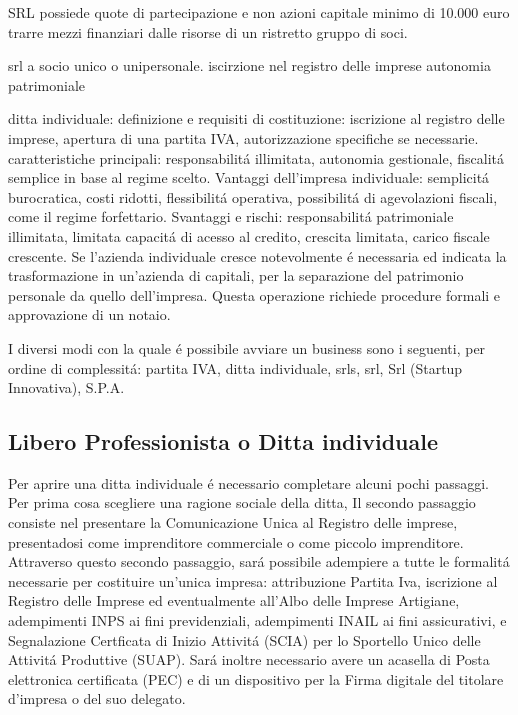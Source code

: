 \documentclass{article}
\begin{document}
SRL
possiede quote di partecipazione e non azioni
capitale minimo di 10.000 euro
trarre mezzi finanziari dalle risorse di un ristretto gruppo di soci. 

srl a socio unico o unipersonale.
iscirzione nel registro delle imprese
autonomia patrimoniale

ditta individuale:
definizione e requisiti di costituzione: iscrizione al registro delle imprese, apertura di una partita IVA, autorizzazione specifiche se necessarie.
caratteristiche principali: responsabilit\'a illimitata, autonomia gestionale, fiscalit\'a semplice in base al regime scelto.
Vantaggi dell'impresa individuale: semplicit\'a burocratica, costi ridotti, flessibilit\'a operativa, possibilit\'a di agevolazioni fiscali, come il regime forfettario.
Svantaggi e rischi: responsabilit\'a patrimoniale illimitata, limitata capacit\'a di acesso al credito, crescita limitata, carico fiscale crescente. 
Se l'azienda individuale cresce notevolmente \'e necessaria ed indicata la trasformazione in un'azienda di capitali, per la separazione del patrimonio personale da quello dell'impresa. Questa operazione richiede procedure formali e approvazione di un notaio.

I diversi modi con la quale \'e possibile avviare un business sono i seguenti, per ordine di complessit\'a:
partita IVA, ditta individuale, srls, srl, Srl (Startup Innovativa), S.P.A.


\subsection{Libero Professionista o Ditta individuale}
Per aprire una ditta individuale \'e necessario completare alcuni pochi passaggi. Per prima cosa scegliere una ragione sociale della ditta,
Il secondo passaggio consiste nel presentare la Comunicazione Unica al Registro delle imprese, presentadosi come imprenditore commerciale o come piccolo imprenditore.
Attraverso questo secondo passaggio, sar\'a possibile adempiere a tutte le formalit\'a necessarie per costituire un'unica impresa: attribuzione Partita Iva, iscrizione al Registro delle Imprese ed eventualmente all'Albo delle Imprese Artigiane,
adempimenti INPS ai fini previdenziali, adempimenti INAIL ai fini assicurativi, e Segnalazione Certficata di Inizio Attivit\'a (SCIA) per lo Sportello Unico delle Attivit\'a Produttive (SUAP).
Sar\'a inoltre necessario avere un acasella di Posta elettronica certificata (PEC) e di un dispositivo per la Firma digitale del titolare d'impresa o del suo delegato.
\end{document}
